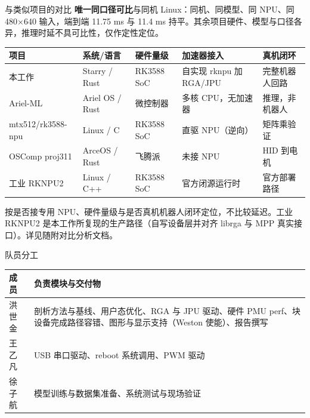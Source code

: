 \documentclass[aspectratio=169,fontset=mac]{ctexbeamer}
\newcommand{\hdr}[1]{\textsf{\bfseries\color{ink}#1}}
\newcommand{\headrow}{\rowcolor{tinthdr}}
\begin{document}
\begin{frame}{与类似项目的对比}
\small
\textbf{\color{ink}唯一同口径可比}\quad 与同机 Linux：同机、同模型、同 NPU、同 480×640 输入，端到端 11.75 ms 与 11.4 ms 持平。其余项目硬件、模型与口径各异，推理时延不具可比性，仅作定性定位。
\vskip5pt
\scriptsize
\begin{tabular}{@{}p{}p{}p{}p{}p{}@{}}
\toprule
\headrow \hdr{项目} & \hdr{系统/语言} & \hdr{硬件量级} & \hdr{加速器接入} & \hdr{真机闭环}\\
\midrule
本工作 & Starry / Rust & RK3588 SoC & 自实现 rknpu 加 RGA/JPU & 完整机器人回路\\
Ariel-ML & Ariel OS / Rust & 微控制器 & 多核 CPU，无加速器 & 推理，非机器人\\
mtx512/rk3588-npu & Linux / C & RK3588 SoC & 直驱 NPU（逆向）& 矩阵乘验证\\
OSComp proj311 & ArceOS / Rust & 飞腾派 & 未接 NPU & HID 到电机\\
工业 RKNPU2 & Linux / C++ & RK3588 SoC & 官方闭源运行时 & 官方部署路径\\
\bottomrule
\end{tabular}
\vskip3pt
\footnotesize 按是否接专用 NPU、硬件量级与是否真机机器人闭环定位，不比较延迟。工业 RKNPU2 是本工作所复现的生产路径（自写设备层并对齐 librga 与 MPP 真实接口）。详见随附对比分析文档。
\end{frame}

\begin{frame}{队员分工}
\small
\begin{tabular}{@{}lp{}@{}}
\toprule
\headrow \hdr{成员} & \hdr{负责模块与交付物}\\
\midrule
洪世金 & 剖析方法与基线、用户态优化、RGA 与 JPU 驱动、硬件 PMU perf、块设备完成路径容错、图形与显示支持（Weston 使能）、报告撰写\\
王乙凡 & USB 串口驱动、reboot 系统调用、PWM 驱动\\
徐子航 & 模型训练与数据集准备、系统测试与现场验证\\
\bottomrule
\end{tabular}
\end{frame}
\end{document}
